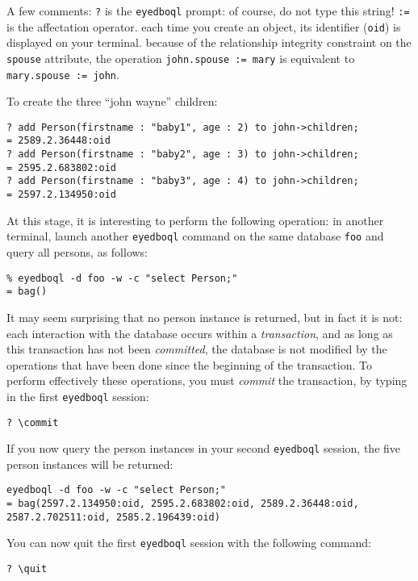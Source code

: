 A few comments:
\idt \texttt{?} is the \texttt{eyedboql} prompt: of course, do not type
this string!
\idt \texttt{:=} is the affectation operator.
\idt each time you create an object, its identifier (\texttt{oid}) is displayed
on your terminal.
\idt because of the relationship integrity constraint on the \texttt{spouse}
attribute, the operation \texttt{john.spouse := mary} is equivalent to
\texttt{mary.spouse := john}.

To create the three ``john wayne'' children:
\verbsize \begin{verbatim}
? add Person(firstname : "baby1", age : 2) to john->children;
= 2589.2.36448:oid
? add Person(firstname : "baby2", age : 3) to john->children;
= 2595.2.683802:oid
? add Person(firstname : "baby3", age : 4) to john->children;
= 2597.2.134950:oid
\end{verbatim}
\normalsize

At this stage, it is interesting to perform the following operation:
in another terminal, launch another \texttt{eyedboql} command on the same database \texttt{foo} and query all persons, as follows:
\verbsize \begin{verbatim}
% eyedboql -d foo -w -c "select Person;"
= bag()
\end{verbatim}
\normalsize

It may seem surprising that no person instance is returned, but in fact it is not: each interaction with the database occurs within a \emph{transaction}, and as long as this transaction has not been \emph{committed}, the database is not modified by the operations that have been done since the beginning of the transaction. To perform effectively these operations, you must \emph{commit} the transaction, by typing in the first \texttt{eyedboql} session:
\verbsize \begin{verbatim}
? \commit
\end{verbatim}
\normalsize

If you now query the person instances in your second \texttt{eyedboql}
session, the five person instances will be returned:
\verbsize \begin{verbatim}
eyedboql -d foo -w -c "select Person;"
= bag(2597.2.134950:oid, 2595.2.683802:oid, 2589.2.36448:oid, 2587.2.702511:oid, 2585.2.196439:oid)
\end{verbatim}
\normalsize

You can now quit the first \texttt{eyedboql} session with the following command:
\verbsize \begin{verbatim}
? \quit
\end{verbatim}
\normalsize


